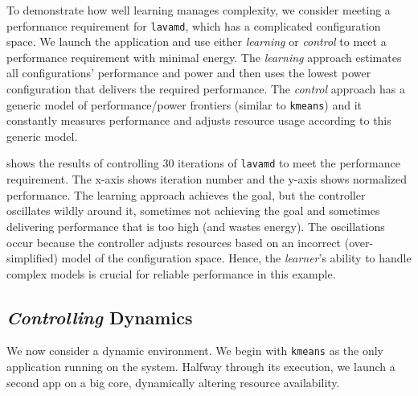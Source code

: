 To demonstrate how well learning manages complexity, we consider
meeting a performance requirement for \texttt{lavamd}, which has a
complicated configuration space.  We launch the application and use
either \emph{learning} or \emph{control} to meet a performance
requirement with minimal energy.  The \emph{learning} approach
estimates all configurations' performance and power and then uses the
lowest power configuration that delivers the required performance.
The \emph{control} approach has a generic model of performance/power
frontiers (similar to \texttt{kmeans}) and it constantly measures
performance and adjusts resource usage according to this generic
model.  

 shows the results of controlling 30
iterations of \texttt{lavamd} to meet the performance requirement.
The x-axis shows iteration number and the y-axis shows normalized
performance.  The learning approach achieves the goal, but the
controller oscillates wildly around it, sometimes not achieving the
goal and sometimes delivering performance that is too high (and wastes
energy). The oscillations occur because the controller adjusts
resources based on an incorrect (over-simplified) model of the
configuration space. Hence, the \emph{learner}'s ability to handle
complex models is crucial for reliable performance in this example.


\subsection{\emph{Controlling} Dynamics}
We now consider a dynamic environment.  We begin with \texttt{kmeans}
as the only application running on the system.  Halfway through its
execution, we launch a second app on a big core, dynamically altering
resource availability.

